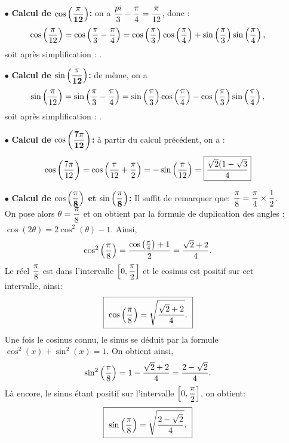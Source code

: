 \documentclass[a4paper, 11pt]{article}
\begin{document}
\begin{correction}  \;
\begin{itemize}
\item[$\bullet$] \textbf{Calcul de $\mathbf{\cos{\left(\displaystyle\frac{\pi}{12}\right)}}$:} on a $\displaystyle \frac{pi}{3}-\frac{\pi}{4} = \frac{\pi}{12}$, donc :
$$\displaystyle \cos\left(\displaystyle\frac{\pi}{12}\right) = \cos\left(\frac{\pi}{3}-\frac{\pi}{4}\right) = \cos \left(\frac{\pi}{3}\right)\cos \left(\frac{\pi}{4}\right) + \sin \left(\frac{\pi}{3}\right)\sin \left(\frac{\pi}{4}\right),$$
soit apr\`es simplification : .
\item[$\bullet$] \textbf{Calcul de $\mathbf{\sin{\left(\displaystyle\frac{\pi}{12}\right)}}$:}  de m\^eme, on a 
$$\displaystyle \sin\left(\displaystyle\frac{\pi}{12}\right) = \sin\left(\frac{\pi}{3}-\frac{\pi}{4}\right) = \sin \left(\frac{\pi}{3}\right)\cos \left(\frac{\pi}{4}\right) - \cos \left(\frac{\pi}{3}\right)\sin \left(\frac{\pi}{4}\right),$$
soit apr\`es simplification : .
\item[$\bullet$] \textbf{Calcul de $\mathbf{\cos{\left(\displaystyle\frac{7\pi}{12}\right)}}$:} \`a partir du calcul pr\'ec\'edent, on a :
$$\displaystyle \cos{\left(\displaystyle\frac{7\pi}{12}\right)} = \cos{\left(\displaystyle\frac{\pi}{12}+\frac{\pi}{2}\right)} = -\sin{\left(\displaystyle\frac{\pi}{12}\right)} = \fbox{$\displaystyle \frac{\sqrt{2}(1-\sqrt{3}}{4}$}$$
\item[$\bullet$] \textbf{Calcul de $\mathbf{\cos{\left(\displaystyle\frac{\pi}{8}\right)}}$ et $\mathbf{\sin{\left(\displaystyle\frac{\pi}{8}\right)}}$:}  Il suffit de remarquer que: $\displaystyle\frac{\pi}{8}=\frac{\pi}{4}\times \frac{1}{2}$. On pose alors $\theta=\displaystyle\frac{\pi}{8}$ et on obtient par la formule de duplication des angles : $\cos{(2\theta)}=2\cos^2{(\theta)}-1.$
Ainsi, 
$$\cos^2{\left(\displaystyle\frac{\pi}{8}\right)}=\displaystyle\frac{\cos{\left(\frac{\pi}{4}\right)}+1}{2}=\displaystyle\frac{\sqrt{2}+2}{4}.$$
Le r\'eel $\displaystyle\frac{\pi}{8}$ est dans l'intervalle $\left\lbrack 0,\displaystyle\frac{\pi}{2}\right\rbrack$ et le cosinus est positif sur cet intervalle, ainsi: 
\begin{equation*}
\fbox{
$\cos{\left(\displaystyle\frac{\pi}{8}\right)}=\displaystyle\sqrt{\frac{\sqrt{2}+2}{4}}.$
}
\end{equation*}
Une fois le cosinus connu, le sinus se d\'eduit par la formule $\cos^2{(x)}+\sin^2{(x)}=1$. On obtient ainsi, 
$$\sin^2{\left(\displaystyle\frac{\pi}{8}\right)}=1-\displaystyle \frac{\sqrt{2}+2}{4} = \frac{2-\sqrt{2}}{4}.$$
L\`a encore, le sinus \'etant positif sur l'intervalle $\left\lbrack 0,\displaystyle\frac{\pi}{2}\right\rbrack$, on obtient: 
\begin{equation*}
\fbox{
$\sin{\left(\displaystyle\frac{\pi}{8}\right)}=\displaystyle\sqrt{\frac{2-\sqrt{2}}{4}}.$
}
\end{equation*}
\end{itemize}
\end{correction}
\end{document}
